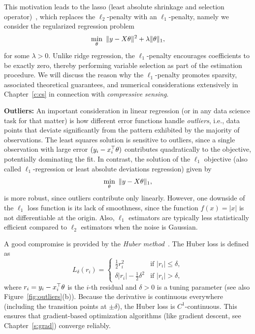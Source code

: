 This motivation leads to the lasso (least absolute shrinkage and selection operator)~\cite{Tib96,hastieelements}, which replaces the $\ell_2$-penalty with an $\ell_1$-penalty, namely we consider the regularized regression problem
\begin{equation}\label{eq:lasso1}
\min_{\theta} \, \, \|y - X\theta\|^2 + \lambda \|\theta\|_1,
\end{equation}
for some $\lambda > 0$.
Unlike ridge regression, the $\ell_1$-penalty encourages coefficients to be exactly zero, thereby performing variable selection as part of the estimation procedure.
We will discuss the reason why the $\ell_1$-penalty promotes sparsity, associated theoretical guarantees, and numerical considerations extensively in Chapter~\ref{c:cs} in connection with {\em compressive sensing}.

\medskip
\noindent
\textbf{Outliers:}
An important consideration in linear regression (or in any data science task for that matter) is how different error functions handle {\em outliers}, i.e., data points that deviate significantly from the pattern exhibited by the majority of observations.
The least squares solution is sensitive to outliers, since a single observation with large error  $(y_i - x_i^\top\theta)$ contributes quadratically to the objective, potentially  dominating the fit. In contrast, the solution of the $\ell_1$ objective (also called $\ell_1$-regression or least absolute deviations regression) given by
$$
\min_{\theta} \, \, \|y - X\theta\|_1,
$$
is more robust, since outliers contribute only linearly. However, one downside of the $\ell_1$ loss function is its lack of smoothness, since the function $f(x)=|x|$ is not differentiable at the origin. Also, $\ell_1$ estimators are typically less statistically efficient compared to $\ell_2$ estimators when the noise is Gaussian.

A good compromise is provided by the 
 {\em Huber method}~\cite{huber1992robust}. The Huber loss is defined as
$$L_\delta(r_i) = \begin{cases}
\frac{1}{2}r_i^2 & \text{if } |r_i| \leq \delta, \\
\delta |r_i| - \frac{1}{2}\delta^2 & \text{if } |r_i| > \delta,
\end{cases}$$
where $r_i = y_i - x_i^\top \theta$ is the $i$-th residual and 
$\delta > 0$ is a tuning parameter (see also Figure~\ref{fig:outliers}(b)).
Because the derivative is continuous everywhere (including the transition points at $\pm \delta$), the Huber loss is $C^1$-continuous. This ensures that gradient-based optimization algorithms (like gradient descent, see Chapter~\ref{s:grad}) converge reliably.

